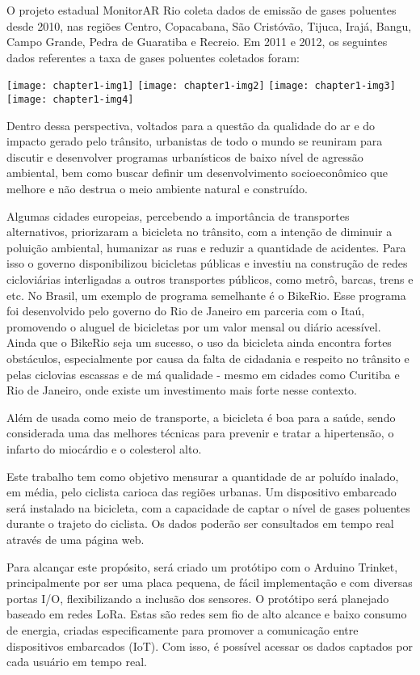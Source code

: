 O projeto estadual MonitorAR Rio coleta dados de emissão de gases poluentes desde 2010, 
nas regiões Centro, Copacabana, São Cristóvão, Tijuca, Irajá, Bangu, Campo Grande, 
Pedra de Guaratiba e Recreio. Em 2011 e 2012, os seguintes dados referentes a taxa de 
gases poluentes coletados foram:

\texttt{[image: chapter1-img1]}
\texttt{[image: chapter1-img2]}
\texttt{[image: chapter1-img3]}
\texttt{[image: chapter1-img4]}

Dentro dessa perspectiva, voltados para a questão da qualidade do ar e do impacto 
gerado pelo trânsito, urbanistas de todo o mundo se reuniram para discutir e desenvolver 
programas urbanísticos de baixo nível de agressão ambiental, bem como buscar definir um 
desenvolvimento socioeconômico que melhore e não destrua o meio ambiente natural e 
construído.

Algumas cidades europeias, percebendo a importância de transportes alternativos, 
priorizaram a bicicleta no trânsito, com a intenção de diminuir a poluição ambiental, 
humanizar as ruas e reduzir a quantidade de acidentes. Para isso o governo disponibilizou 
bicicletas públicas e investiu na construção de redes cicloviárias interligadas a outros 
transportes públicos, como metrô, barcas, trens e etc. No Brasil, um exemplo de programa 
semelhante é o BikeRio. Esse programa foi desenvolvido pelo governo do Rio de Janeiro em 
parceria com o Itaú, promovendo o aluguel de bicicletas por um valor mensal ou diário 
acessível. Ainda que o BikeRio seja um sucesso, o uso da bicicleta ainda encontra fortes 
obstáculos, especialmente por causa da falta de cidadania e respeito no trânsito e pelas 
ciclovias escassas e de má qualidade - mesmo em cidades como Curitiba e Rio de Janeiro, 
onde existe um investimento mais forte nesse contexto.

Além de usada como meio de transporte, a bicicleta é boa para a saúde, sendo considerada 
uma das melhores técnicas para prevenir e tratar a hipertensão, o infarto do miocárdio e 
o colesterol alto.

Este trabalho tem como objetivo mensurar a quantidade de ar poluído inalado, em média, pelo 
ciclista carioca das regiões urbanas. Um dispositivo embarcado será instalado na bicicleta, 
com a capacidade de captar o nível de gases poluentes durante o trajeto do ciclista. Os 
dados poderão ser consultados em tempo real através de uma página web.

Para alcançar este propósito, será criado um protótipo com o Arduino Trinket, principalmente 
por ser uma placa pequena, de fácil implementação e com diversas portas I/O, flexibilizando 
a inclusão dos sensores. O protótipo será planejado baseado em redes LoRa. Estas são redes 
sem fio de alto alcance e baixo consumo de energia, criadas especificamente para promover a 
comunicação entre dispositivos embarcados (IoT). Com isso, é possível acessar os dados 
captados por cada usuário em tempo real.

